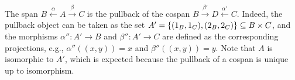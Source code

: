 \begin{example}
\begin{center}
{
      }
    \end{center} 
    The span \( B \overset{\alpha}{\leftarrow} A \overset{\beta}{\rightarrow} C \)
    is the pullback of the cospan \(B \overset{\beta'}{\rightarrow} D \overset{\alpha'}{\leftarrow} C \).
    Indeed, the pullback object can be taken as the set $A' = \{(1_B,1_C),(2_B,2_C)\} \subseteq B \times C$, and the morphisms $\alpha'' \colon A' \to B$ and $\beta'' \colon A' \to C$ are defined as the corresponding projections, e.g., $\alpha''((x,y)) = x$ and $\beta''((x,y)) = y$. Note that $A$ is isomorphic to $A'$, which is expected because the pullback of a cospan is unique up to isomorphism.
\end{example}

